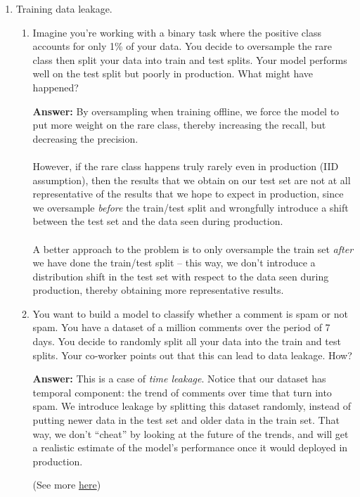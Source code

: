 \documentclass{article}
\newenvironment{QandA}{\begin{enumerate}[label=\arabic*.]}{\end{enumerate}}
\newenvironment{InnerQandA}{\begin{enumerate}[label=\roman*.]}{\end{enumerate}}
\newenvironment{answer}{\par\normalfont \textbf{Answer:}}{}
\begin{document}
\begin{QandA}
    \item Training data leakage.
    \begin{InnerQandA}
        \item Imagine you're working with a binary task where the positive class accounts for only 1\% of your data. You decide to oversample the rare class then split your data into train and test splits. Your model performs well on the test split but poorly in production. What might have happened?
        \begin{answer}
            By oversampling when training offline, we force the model to put more weight on the rare class, thereby increasing the recall, but decreasing the precision. \\\\
            However, if the rare class happens truly rarely even in production (IID assumption), then the results that we obtain on our test set are not at all representative of the results that we hope to expect in production, since we oversample \textit{before} the train/test split and wrongfully introduce a shift between the test set and the data seen during production. \\\\
            A better approach to the problem is to only oversample the train set \textit{after} we have done the train/test split -- this way, we don't introduce a distribution shift in the test set with respect to the data seen during production, thereby obtaining more representative results.
        \end{answer}

        \item You want to build a model to classify whether a comment is spam or not spam. You have a dataset of a million comments over the period of 7 days. You decide to randomly split all your data into the train and test splits. Your co-worker points out that this can lead to data leakage. How?
        \begin{answer}
            This is a case of \textit{time leakage}. Notice that our dataset has temporal component: the trend of comments over time that turn into spam. We introduce leakage by splitting this dataset randomly, instead of putting newer data in the test set and older data in the train set. That way, we don't ``cheat'' by looking at the future of the trends, and will get a realistic estimate of the model's performance once it would deployed in production.

            (See more \href{https://en.wikipedia.org/wiki/Leakage_(machine_learning)}{here})
        \end{answer}
    \end{InnerQandA}


\end{QandA}
\end{document}
